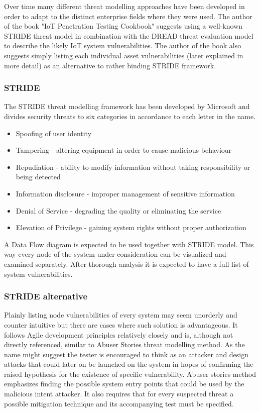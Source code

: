Over time many different threat modelling approaches have been developed in order to adapt to the distinct enterprise fields where they were used. The author of the book "IoT Penetration Testing Cookbook"\cite{cookbook} suggests using a well-known STRIDE threat model in combination with the DREAD threat evaluation model to describe the likely IoT system vulnerabilities. The author of the book also suggests simply listing each individual asset vulnerabilities (later explained in more detail) as an alternative to rather binding STRIDE framework\cite{cookbook}.

\subsubsection{STRIDE}
The STRIDE threat modelling framework has been developed by Microsoft and divides security threats to six categories\cite{stride-mic} in accordance to each letter in the name.
\begin {itemize}
\item Spoofing of user identity
\item Tampering - altering equipment in order to cause malicious behaviour
\item Repudiation - ability to modify information without taking responsibility or being detected
\item Information disclosure - improper management of sensitive information
\item Denial of Service - degrading the quality or eliminating the service
\item Elevation of Privilege - gaining system rights without proper authorization
\end{itemize}

A Data Flow diagram is expected to be used together with STRIDE model. This way every node of the system under consideration can be visualized and examined separately. After thorough analysis it is expected to have a full list of system vulnerabilities.

\subsubsection{STRIDE alternative}
Plainly listing node vulnerabilities of every system may seem unorderly and counter intuitive but there are cases where such solution is advantageous. It follows Agile development principles relatively closely and is, although not directly referenced, similar to Abuser Stories threat modelling method. As the name might suggest the tester is encouraged to think as an attacker and design attacks that could later on be launched on the system in hopes of confirming the raised hypothesis for the existence of specific vulnerability. Abuser stories method emphasizes finding the possible system entry points that could be used by the malicious intent attacker. It also requires that for every suspected threat a possible mitigation technique and its accompanying test must be specified\cite{Peeters2005AgileSR}.

